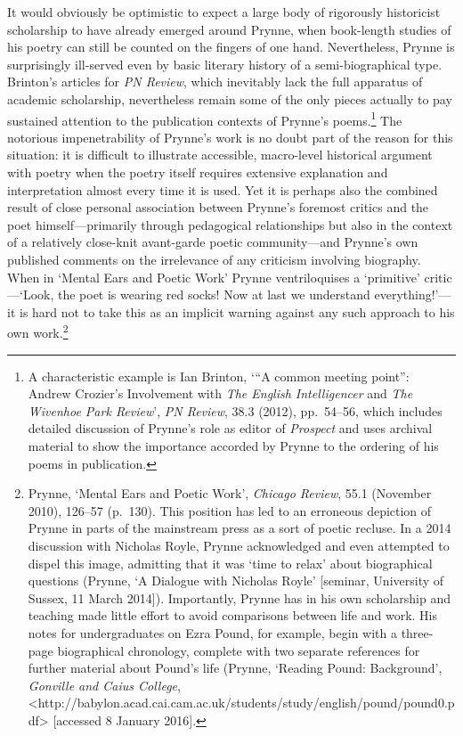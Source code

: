 \documentclass[]{article}
\begin{document}
It would obviously be optimistic to expect a large body of rigorously
historicist scholarship to have already emerged around Prynne, when
book-length studies of his poetry can still be counted on the fingers of
one hand. Nevertheless, Prynne is surprisingly ill-served even by basic
literary history of a semi-biographical type. Brinton’s articles for
\emph{PN Review}, which inevitably lack the full apparatus of academic
scholarship, nevertheless remain some of the only pieces actually to pay
sustained attention to the publication contexts of Prynne’s
poems.\footnote{A characteristic example is Ian Brinton, ‘“A common
  meeting point”: Andrew Crozier’s Involvement with \emph{The English
  Intelligencer} and \emph{The Wivenhoe Park Review}’, \emph{PN Review},
  38.3 (2012), pp.~54–56, which includes detailed discussion of Prynne’s
  role as editor of \emph{Prospect} and uses archival material to show
  the importance accorded by Prynne to the ordering of his poems in
  publication.} The notorious impenetrability of Prynne’s work is no
doubt part of the reason for this situation: it is difficult to
illustrate accessible, macro-level historical argument with poetry when
the poetry itself requires extensive explanation and interpretation
almost every time it is used. Yet it is perhaps also the combined result
of close personal association between Prynne’s foremost critics and the
poet himself—primarily through pedagogical relationships but also in the
context of a relatively close-knit avant-garde poetic community—and
Prynne’s own published comments on the irrelevance of any criticism
involving biography. When in ‘Mental Ears and Poetic Work’ Prynne
ventriloquises a ‘primitive’ critic—‘Look, the poet is wearing red
socks! Now at last we understand everything!’—it is hard not to take
this as an implicit warning against any such approach to his own
work.\footnote{Prynne, ‘Mental Ears and Poetic Work’, \emph{Chicago
  Review}, 55.1 (November 2010), 126–57 (p.~130). This position has led
  to an erroneous depiction of Prynne in parts of the mainstream press
  as a sort of poetic recluse. In a 2014 discussion with Nicholas Royle,
  Prynne acknowledged and even attempted to dispel this image, admitting
  that it was ‘time to relax’ about biographical questions (Prynne, ‘A
  Dialogue with Nicholas Royle’ {[}seminar, University of Sussex, 11
  March 2014{]}). Importantly, Prynne has in his own scholarship and
  teaching made little effort to avoid comparisons between life and
  work. His notes for undergraduates on Ezra Pound, for example, begin
  with a three-page biographical chronology, complete with two separate
  references for further material about Pound’s life (Prynne, ‘Reading
  Pound: Background’, \emph{Gonville and Caius College},
  \textless{}http://babylon.acad.cai.cam.ac.uk/students/study/english/pound/pound0.pdf\textgreater{}
  {[}accessed 8 January 2016{]}.}
\end{document}
